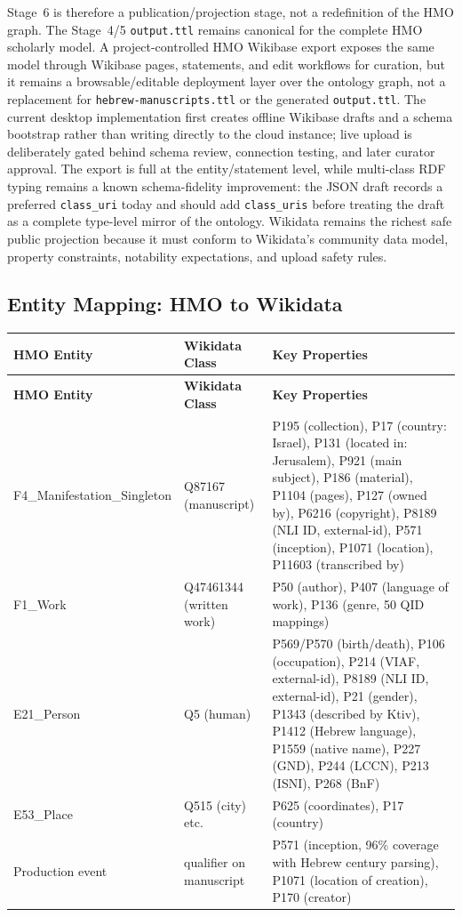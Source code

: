 \documentclass[12pt]{article}
\newcommand{\code}[1]{\texttt{#1}}
\begin{document}
Stage~6 is therefore a publication/projection stage, not a redefinition of the HMO graph. The Stage~4/5 \code{output.ttl} remains canonical for the complete HMO scholarly model. A project-controlled HMO Wikibase export exposes the same model through Wikibase pages, statements, and edit workflows for curation, but it remains a browsable/editable deployment layer over the ontology graph, not a replacement for \code{hebrew-manuscripts.ttl} or the generated \code{output.ttl}. The current desktop implementation first creates offline Wikibase drafts and a schema bootstrap rather than writing directly to the cloud instance; live upload is deliberately gated behind schema review, connection testing, and later curator approval. The export is full at the entity/statement level, while multi-class RDF typing remains a known schema-fidelity improvement: the JSON draft records a preferred \code{class\_uri} today and should add \code{class\_uris} before treating the draft as a complete type-level mirror of the ontology. Wikidata remains the richest safe public projection because it must conform to Wikidata's community data model, property constraints, notability expectations, and upload safety rules.

\subsection{Entity Mapping: HMO to Wikidata}

\begin{longtable}{|l|l|l|}
\hline
\textbf{HMO Entity} & \textbf{Wikidata Class} & \textbf{Key Properties} \\
\hline
\endfirsthead
\hline
\textbf{HMO Entity} & \textbf{Wikidata Class} & \textbf{Key Properties} \\
\hline
\endhead
\hline
\endfoot
F4\_Manifestation\_Singleton & Q87167 (manuscript) & P195 (collection), P17 (country: Israel), P131 (located in: Jerusalem), P921 (main subject), P186 (material), P1104 (pages), P127 (owned by), P6216 (copyright), P8189 (NLI ID, external-id), P571 (inception), P1071 (location), P11603 (transcribed by) \\
\hline
F1\_Work & Q47461344 (written work) & P50 (author), P407 (language of work), P136 (genre, 50 QID mappings) \\
\hline
E21\_Person & Q5 (human) & P569/P570 (birth/death), P106 (occupation), P214 (VIAF, external-id), P8189 (NLI ID, external-id), P21 (gender), P1343 (described by Ktiv), P1412 (Hebrew language), P1559 (native name), P227 (GND), P244 (LCCN), P213 (ISNI), P268 (BnF) \\
\hline
E53\_Place & Q515 (city) etc. & P625 (coordinates), P17 (country) \\
\hline
Production event & qualifier on manuscript & P571 (inception, 96\% coverage with Hebrew century parsing), P1071 (location of creation), P170 (creator) \\
\hline
\end{longtable}
\end{document}
